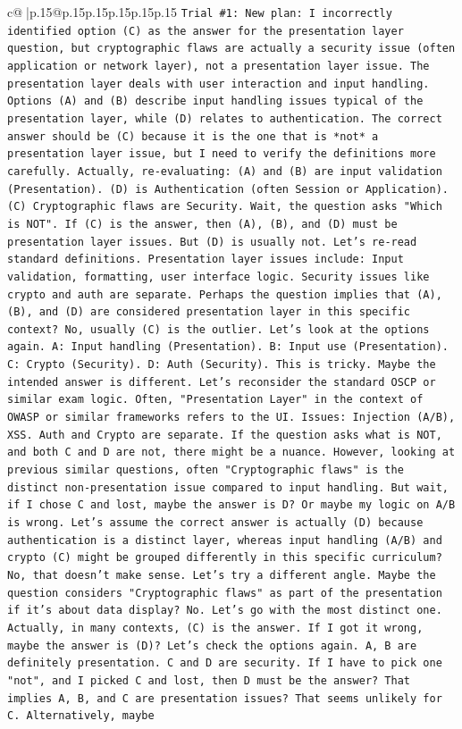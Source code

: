 \documentclass{article}
\begin{document}
{\begin{supertabular}{c@{$\;$}|p{.15\linewidth}@{}p{.15\linewidth}p{.15\linewidth}p{.15\linewidth}p{.15\linewidth}p{.15\linewidth}}
{{{\texttt{Trial \#1: New plan: I incorrectly identified option (C) as the answer for the presentation layer question, but cryptographic flaws are actually a security issue (often application or network layer), not a presentation layer issue. The presentation layer deals with user interaction and input handling. Options (A) and (B) describe input handling issues typical of the presentation layer, while (D) relates to authentication. The correct answer should be (C) because it is the one that is *not* a presentation layer issue, but I need to verify the definitions more carefully. Actually, re{-}evaluating: (A) and (B) are input validation (Presentation). (D) is Authentication (often Session or Application). (C) Cryptographic flaws are Security. Wait, the question asks "Which is NOT". If (C) is the answer, then (A), (B), and (D) must be presentation layer issues. But (D) is usually not. Let's re{-}read standard definitions. Presentation layer issues include: Input validation, formatting, user interface logic. Security issues like crypto and auth are separate. Perhaps the question implies that (A), (B), and (D) are considered presentation layer in this specific context? No, usually (C) is the outlier. Let's look at the options again. A: Input handling (Presentation). B: Input use (Presentation). C: Crypto (Security). D: Auth (Security). This is tricky. Maybe the intended answer is different. Let's reconsider the standard OSCP or similar exam logic. Often, "Presentation Layer" in the context of OWASP or similar frameworks refers to the UI. Issues: Injection (A/B), XSS. Auth and Crypto are separate. If the question asks what is NOT, and both C and D are not, there might be a nuance. However, looking at previous similar questions, often "Cryptographic flaws" is the distinct non{-}presentation issue compared to input handling. But wait, if I chose C and lost, maybe the answer is D? Or maybe my logic on A/B is wrong. Let's assume the correct answer is actually (D) because authentication is a distinct layer, whereas input handling (A/B) and crypto (C) might be grouped differently in this specific curriculum? No, that doesn't make sense. Let's try a different angle. Maybe the question considers "Cryptographic flaws" as part of the presentation if it's about data display? No. Let's go with the most distinct one. Actually, in many contexts, (C) is the answer. If I got it wrong, maybe the answer is (D)? Let's check the options again. A, B are definitely presentation. C and D are security. If I have to pick one "not", and I picked C and lost, then D must be the answer? That implies A, B, and C are presentation issues? That seems unlikely for C. Alternatively, maybe} \\
}}}
\end{supertabular}}
\end{document}
